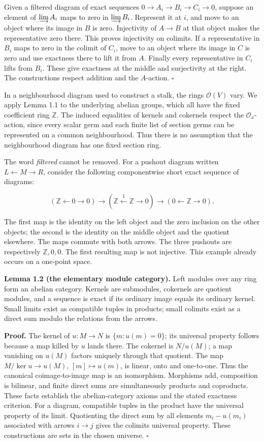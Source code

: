 \documentclass[
  english,
  11pt,
  a4paper,
]{article}
\begin{document}
Given a filtered diagram of exact sequences
\(0\to A_i\to B_i\to C_i\to0\), suppose an element of \(\varinjlim A_i\)
maps to zero in \(\varinjlim B_i\). Represent it at \(i\), and move to
an object where its image in \(B\) is zero. Injectivity of \(A\to B\) at
that object makes the representative zero there. This proves injectivity
on colimits. If a representative in \(B_i\) maps to zero in the colimit
of \(C_i\), move to an object where its image in \(C\) is zero and use
exactness there to lift it from \(A\). Finally every representative in
\(C_i\) lifts from \(B_i\). These give exactness at the middle and
surjectivity at the right. The constructions respect addition and the
\(A\)-action. \(\square\)

In a neighbourhood diagram used to construct a stalk, the rings
\(\mathcal O(V)\) vary. We apply Lemma 1.1 to the underlying abelian
groups, which all have the fixed coefficient ring \(\mathbb Z\). The
induced equalities of kernels and cokernels respect the
\(\mathcal O_x\)-action, since every scalar germ and each finite list of
section germs can be represented on a common neighbourhood. Thus there
is no assumption that the neighbourhood diagram has one fixed section
ring.

The word \emph{filtered} cannot be removed. For a pushout diagram
written \(L\leftarrow M\to R\), consider the following componentwise
short exact sequence of diagrams:

\[(\mathbb Z\leftarrow0\to0)
\longrightarrow(\mathbb Z\xleftarrow{1}\mathbb Z\to0)
\longrightarrow(0\leftarrow\mathbb Z\to0).\]

The first map is the identity on the left object and the zero inclusion
on the other objects; the second is the identity on the middle object
and the quotient elsewhere. The maps commute with both arrows. The three
pushouts are respectively \(\mathbb Z,0,0\). The first resulting map is
not injective. This example already occurs on a one-point space.

\textbf{Lemma 1.2 (the elementary module category).} Left modules over
any ring form an abelian category. Kernels are submodules, cokernels are
quotient modules, and a sequence is exact if its ordinary image equals
its ordinary kernel. Small limits exist as compatible tuples in
products; small colimits exist as a direct sum modulo the relations from
the arrows.

\textbf{Proof.} The kernel of \(u:M\to N\) is \(\{m:u(m)=0\}\); its
universal property follows because a map killed by \(u\) lands there.
The cokernel is \(N/u(M)\); a map vanishing on \(u(M)\) factors uniquely
through that quotient. The map \(M/\ker u\to u(M)\),
\([m]\mapsto u(m)\), is linear, onto and one-to-one. Thus the canonical
coimage-to-image map is an isomorphism. Morphisms add, composition is
bilinear, and finite direct sums are simultaneously products and
coproducts. These facts establish the abelian-category axioms and the
stated exactness criterion. For a diagram, compatible tuples in the
product have the universal property of its limit. Quotienting the direct
sum by all elements \(m_i-u(m_i)\) associated with arrows \(i\to j\)
gives the colimit\textquotesingle s universal property. These
constructions are sets in the chosen universe. \(\square\)
\end{document}

